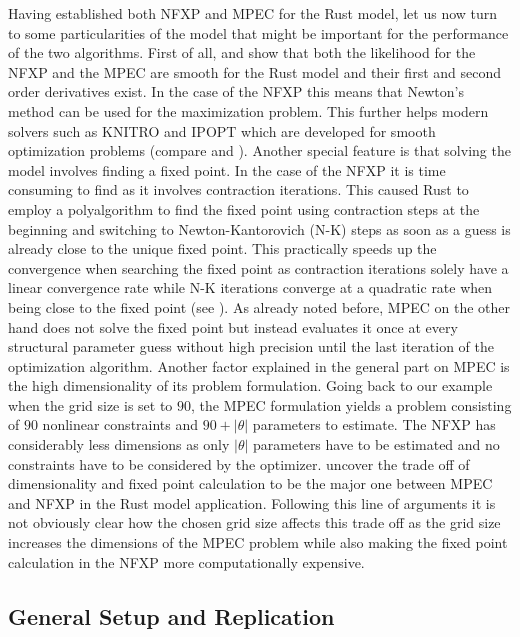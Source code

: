 Having established both NFXP and MPEC for the Rust model, let us now turn to some particularities of the model that might be important for the performance of the two algorithms. First of all, \cite{Rust.1987} and \cite{Su.Judd.2012} show that both the likelihood for the NFXP and the MPEC are smooth for the Rust model and their first and second order derivatives exist. In the case of the NFXP this means that Newton's method can be used for the maximization problem. This further helps modern solvers such as KNITRO and IPOPT which are developed for smooth optimization problems (compare \cite{Byrd.Nocedal.Waltz.2006} and \cite{Waechter2009}). Another special feature is that solving the model involves finding a fixed point. In the case of the NFXP it is time consuming to find as it involves contraction iterations. This caused Rust to employ a polyalgorithm to find the fixed point using contraction steps at the beginning and switching to Newton-Kantorovich (N-K) steps as soon as a guess is already close to the unique fixed point. This practically speeds up the convergence when searching the fixed point as contraction iterations solely have a linear convergence rate while N-K iterations converge at a quadratic rate when being close to the fixed point (see \cite{Rust.1987, Rust.2000}). As already noted before, MPEC on the other hand does not solve the fixed point but instead evaluates it once at every structural parameter guess without high precision until the last iteration of the optimization algorithm. Another factor explained in the general part on MPEC is the high dimensionality of its problem formulation. Going back to our example when the grid size is set to $90$, the MPEC formulation yields a problem consisting of $90$ nonlinear constraints and $90 + |\theta|$ parameters to estimate. The NFXP has considerably less dimensions as only $|\theta|$ parameters have to be estimated and no constraints have to be considered by the optimizer. \cite{Su.Judd.2012} uncover the trade off of dimensionality and fixed point calculation to be the major one between MPEC and NFXP in the Rust model application. Following this line of arguments it is not obviously clear how the chosen grid size affects this trade off as the grid size increases the dimensions of the MPEC problem while also making the fixed point calculation in the NFXP more computationally expensive. 

\subsection{General Setup and Replication} \label{generalsetup}

